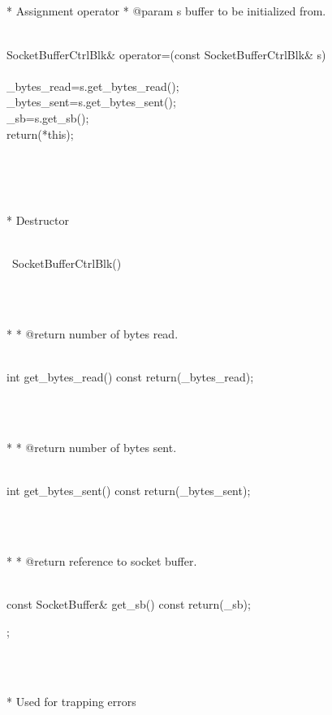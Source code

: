 \documentclass{article}
\begin{document}
{{\\
     }
\strut\\\strut\\* Assignment operator
	  * @param s buffer to be initialized from.
	  \strut\goodbreak
{}\strut\nopagebreak\\
     SocketBufferCtrlBlk& operator=(const SocketBufferCtrlBlk& s)
\\
     {
\\
         _bytes_read=s.get_bytes_read();
\\
         _bytes_sent=s.get_bytes_sent();
\\
         _sb=s.get_sb();
\\
         return(*this);
\\
     }
\strut\\\strut\\* Destructor \strut\goodbreak
{}\strut\nopagebreak\\
     ~SocketBufferCtrlBlk() {}
\strut\\\strut\\*  
	  * @return number of bytes read. 
	  \strut\goodbreak
{}\strut\nopagebreak\\
     int get_bytes_read() const { return(_bytes_read); }
\strut\\\strut\\* 
	  * @return number of bytes sent. 
	  \strut\goodbreak
{}\strut\nopagebreak\\
     int get_bytes_sent() const { return(_bytes_sent); }
\strut\\\strut\\* 
	  * @return reference to socket buffer.
	  \strut\goodbreak
{}\strut\nopagebreak\\
     const SocketBuffer& get_sb() const { return(_sb); }
\\
 };
\strut\\\strut\\* Used for trapping errors \strut\goodbreak
{}\strut\nopagebreak\\
\end{document}
